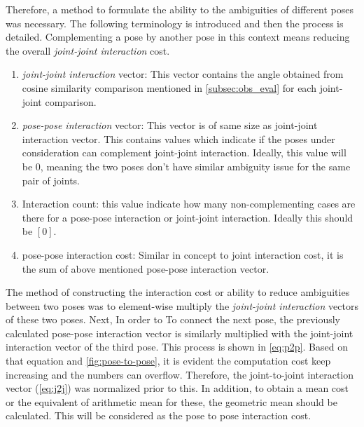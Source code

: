 \documentclass[english, printversion, nomenclature, notitle]{tuvisionthesis} %
\begin{document}
Therefore, a method to formulate the ability to the ambiguities of different poses was necessary. The following terminology is introduced and then the process is detailed. Complementing a pose by another pose in this context means reducing the overall \textit{joint-joint interaction} cost.

\begin{enumerate}
	\item \textit{joint-joint interaction} vector: This vector contains the angle obtained from cosine similarity comparison mentioned in \cref{subsec:obs_eval} for each joint-joint comparison. 
	\item \textit{pose-pose interaction} vector: This vector is of same size as joint-joint interaction vector. This contains values which indicate if the poses under consideration can complement joint-joint interaction. Ideally, this value will be 0, meaning the two poses don't have similar ambiguity issue for the same pair of joints.
	\item Interaction count: this value indicate how many non-complementing cases are there for a pose-pose interaction or joint-joint interaction. Ideally this should be $[0]$.
	\item pose-pose interaction cost: Similar in concept to joint interaction cost, it is the sum of above mentioned pose-pose interaction vector.
\end{enumerate}

The method of constructing the interaction cost or ability to reduce ambiguities between two poses was to element-wise multiply the \textit{joint-joint interaction} vectors of these two poses. Next, In order to To connect the next pose, the previously calculated pose-pose interaction vector is similarly multiplied with the joint-joint interaction vector of the third pose. This process is shown in \cref{eq:p2p}. Based on that equation and \cref{fig:pose-to-pose}, it is evident the computation cost keep increasing and the numbers can overflow. Therefore, the joint-to-joint interaction vector (\cref{eq:j2j}) was normalized prior to this. In addition, to obtain a mean cost or the equivalent of arithmetic mean for these, the geometric mean should be calculated. This will be considered as the pose to pose interaction cost.
\end{document}
